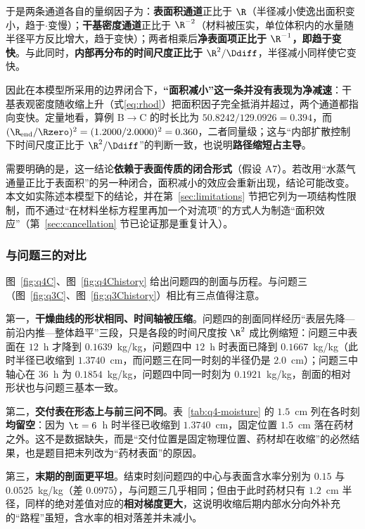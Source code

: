 于是两条通道各自的量纲因子为：\textbf{表面积通道}正比于 $\R$（半径减小使逸出面积变小，趋于$\cdot$变慢）；\textbf{干基密度通道}正比于 ${\R}^{-2}$（材料被压实，单位体积内的水量随半径平方反比增大，趋于变快）；两者相乘后\textbf{净表面项正比于 ${\R}^{-1}$，即趋于变快}。与此同时，\textbf{内部再分布的时间尺度正比于 ${\R}^2/\Ddiff$}，半径减小同样使它变快。

因此在本模型所采用的边界闭合下，\textbf{``面积减小''这一条并没有表现为净减速}：干基表观密度随收缩上升（式\eqref{eq:rhod}）把面积因子完全抵消并超过，两个通道都指向变快。定量地看，算例 B$\to$C 的时长比为 $50.8242/129.0926=0.394$，而 $({\R}_{\text{end}}/\Rzero)^2=(1.2000/2.0000)^2=0.360$，二者同量级；这与``内部扩散控制下时间尺度正比于 ${\R}^2/\Ddiff$''的判断一致，也说明\textbf{路径缩短占主导}。

需要明确的是，这一结论\textbf{依赖于表面传质的闭合形式}（假设 A7）。若改用``水蒸气通量正比于表面积''的另一种闭合，面积减小的效应会重新出现，结论可能改变。本文如实陈述本模型下的结论，并在第~\ref{sec:limitations} 节把它列为一项结构性限制，而不通过``在材料坐标方程里再加一个对流项''的方式人为制造``面积效应''（第~\ref{sec:cancellation} 节已论证那是重复计入）。


\subsubsection{与问题三的对比}

图~\ref{fig:q4C}、图~\ref{fig:q4Chistory} 给出问题四的剖面与历程。与问题三（图~\ref{fig:q3C}、图~\ref{fig:q3Chistory}）相比有三点值得注意。

第一，\textbf{干燥曲线的形状相同、时间轴被压缩}。问题四的剖面同样经历``表层先降—前沿内推—整体趋平''三段，只是各段的时间尺度按 ${\R}^2$ 成比例缩短：问题三中表面在 $12$~h 才降到 $0.1639$~kg/kg，问题四中 $12$~h 时表面已降到 $0.1667$~kg/kg（此时半径已收缩到 $1.3740$~cm，而问题三在同一时刻的半径仍是 $2.0$~cm）；问题三中轴心在 $36$~h 为 $0.1854$~kg/kg，问题四中同一时刻为 $0.1921$~kg/kg，剖面的相对形状也与问题三基本一致。

第二，\textbf{交付表在形态上与前三问不同}。表~\ref{tab:q4-moisture} 的 $1.5$~cm 列在各时刻\textbf{均留空}：因为 $\t=6$~h 时半径已收缩到 $1.3740$~cm，固定位置 $1.5$~cm 落在药材之外。这不是数据缺失，而是``交付位置是固定物理位置、药材却在收缩''的必然结果，也是题目把末列改为``药材表面''的原因。

第三，\textbf{末期的剖面更平坦}。结束时刻问题四的中心与表面含水率分别为 $0.15$ 与 $0.0525$~kg/kg（差 $0.0975$），与问题三几乎相同；但由于此时药材只有 $1.2$~cm 半径，同样的绝对差值对应的\textbf{相对梯度更大}，这说明收缩后期内部水分向外补充的``路程''虽短，含水率的相对落差并未减小。
